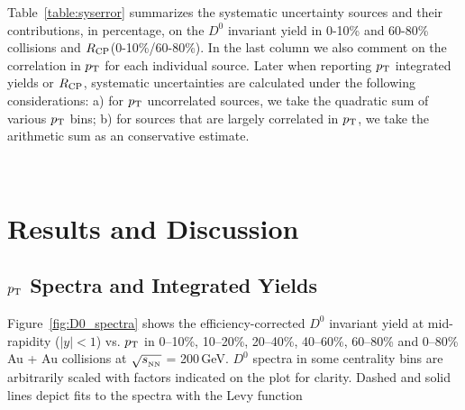 \documentclass[%
 reprint,	
 amsmath,amssymb,
 aps,
 prc,
]{revtex4-1}
\begin{document}
Table~\ref{table:syserror} summarizes the systematic uncertainty sources and their contributions, in percentage, on the $D^0$ invariant yield in 0-10\% and 60-80\% collisions and $R_{\rm CP}$(0-10\%/60-80\%). In the last column we also comment on the correlation in $p_{\rm T}$ for each individual source. Later when reporting $p_{\rm T}$ integrated yields or $R_{\rm CP}$, systematic uncertainties are calculated under the following considerations: a) for $p_{\rm T}$ uncorrelated sources, we take the quadratic sum of various $p_{\rm T}$ bins; b) for sources that are largely correlated in $p_{\rm T}$, we take the arithmetic sum as an conservative estimate.


\
\section{\label{result}Results and Discussion}

\subsection{\label{result:pt}$p_{\rm T}$ Spectra and Integrated Yields}
Figure~\ref{fig:D0_spectra} shows the efficiency-corrected $D^0$ invariant yield at mid-rapidity ($|y|<1$) vs. $p_{\rm T}$ in 0--10\%, 10--20\%, 20--40\%, 40--60\%, 60--80\% and 0--80\% Au + Au collisions at $\sqrt{s_{_{\rm NN}}}$ = 200\,GeV. $D^0$ spectra in some centrality bins are arbitrarily scaled with factors indicated on the plot for clarity. Dashed and solid lines depict fits to the spectra with the Levy function
\end{document}
